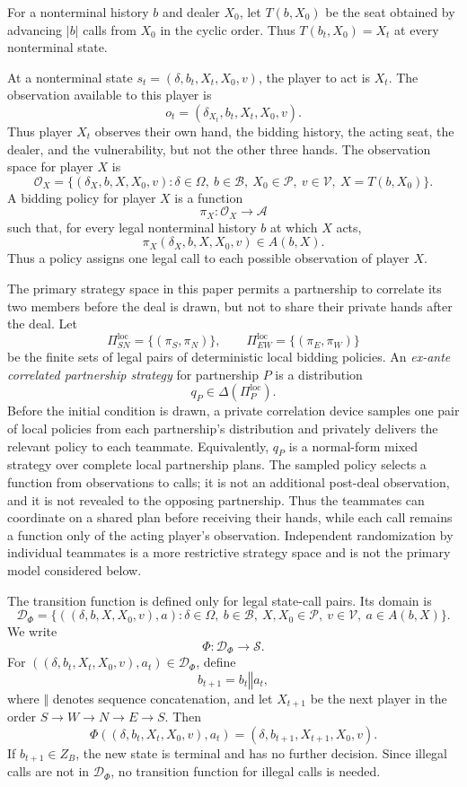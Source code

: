 \documentclass[11pt]{article}
\begin{document}
For a nonterminal history $b$ and dealer $X_0$, let $T(b,X_0)$ be the seat obtained by advancing $|b|$ calls from $X_0$ in the cyclic order. Thus $T(b_t,X_0)=X_t$ at every nonterminal state.

At a nonterminal state $s_t=(\delta,b_t,X_t,X_0,v)$, the player to act is $X_t$. The observation available to this player is
\[
    o_t=(\delta_{X_t},b_t,X_t,X_0,v).
\]
Thus player $X_t$ observes their own hand, the bidding history, the acting seat, the dealer, and the vulnerability, but not the other three hands. The observation space for player $X$ is
\[
    \mathcal{O}_X=\{(\delta_X,b,X,X_0,v): \delta\in\Omega,\ b\in\mathcal{B},\ X_0\in\mathcal{P},\ v\in\mathcal{V},\ X=T(b,X_0)\}.
\]
A bidding policy for player $X$ is a function
\[
    \pi_X:\mathcal{O}_X\to\mathcal{A}
\]
such that, for every legal nonterminal history $b$ at which $X$ acts,
\[
    \pi_X(\delta_X,b,X,X_0,v)\in A(b,X).
\]
Thus a policy assigns one legal call to each possible observation of player $X$.

The primary strategy space in this paper permits a partnership to correlate its two members before the deal is drawn, but not to share their private hands after the deal. Let
\[
    \Pi_{SN}^{\mathrm{loc}}=\{(\pi_S,\pi_N)\},
    \qquad
    \Pi_{EW}^{\mathrm{loc}}=\{(\pi_E,\pi_W)\}
\]
be the finite sets of legal pairs of deterministic local bidding policies. An \emph{ex-ante correlated partnership strategy} for partnership $P$ is a distribution
\[
    q_P\in\Delta(\Pi_P^{\mathrm{loc}}).
\]
Before the initial condition is drawn, a private correlation device samples one pair of local policies from each partnership's distribution and privately delivers the relevant policy to each teammate. Equivalently, $q_P$ is a normal-form mixed strategy over complete local partnership plans. The sampled policy selects a function from observations to calls; it is not an additional post-deal observation, and it is not revealed to the opposing partnership. Thus the teammates can coordinate on a shared plan before receiving their hands, while each call remains a function only of the acting player's observation. Independent randomization by individual teammates is a more restrictive strategy space and is not the primary model considered below.

The transition function is defined only for legal state-call pairs. Its domain is
\[
    \mathcal{D}_{\Phi}=\{((\delta,b,X,X_0,v),a): \delta\in\Omega,\ b\in\mathcal{B},\ X,X_0\in\mathcal{P},\ v\in\mathcal{V},\ a\in A(b,X)\}.
\]
We write
\[
    \Phi:\mathcal{D}_{\Phi}\to\mathcal{S}.
\]
For $((\delta,b_t,X_t,X_0,v),a_t)\in\mathcal{D}_{\Phi}$, define
\[
    b_{t+1}=b_t\mathbin{\Vert}a_t,
\]
where $\Vert$ denotes sequence concatenation, and let $X_{t+1}$ be the next player in the order $S\to W\to N\to E\to S$. Then
\[
    \Phi((\delta,b_t,X_t,X_0,v),a_t)=(\delta,b_{t+1},X_{t+1},X_0,v).
\]
If $b_{t+1}\in Z_B$, the new state is terminal and has no further decision. Since illegal calls are not in $\mathcal{D}_{\Phi}$, no transition function for illegal calls is needed.
\end{document}

